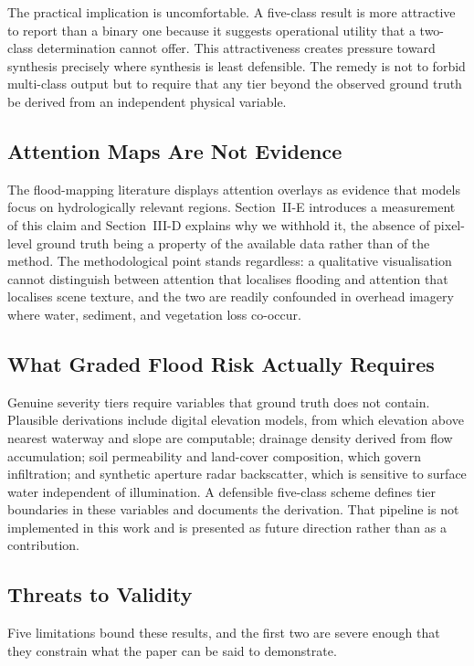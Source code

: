 \documentclass[11pt,journal]{IEEEtran}
\begin{document}
The practical implication is uncomfortable. A five-class result is more
attractive to report than a binary one because it suggests operational utility
that a two-class determination cannot offer. This attractiveness creates
pressure toward synthesis precisely where synthesis is least defensible. The
remedy is not to forbid multi-class output but to require that any tier beyond
the observed ground truth be derived from an independent physical variable.

\subsection{Attention Maps Are Not Evidence}

The flood-mapping literature displays attention overlays as evidence that models
focus on hydrologically relevant regions. Section~II-E introduces a measurement
of this claim and Section~III-D explains why we withhold it, the absence of
pixel-level ground truth being a property of the available data rather than of
the method. The methodological point stands regardless: a qualitative
visualisation cannot distinguish between attention that localises flooding and
attention that localises scene texture, and the two are readily confounded in
overhead imagery where water, sediment, and vegetation loss co-occur.

\subsection{What Graded Flood Risk Actually Requires}

Genuine severity tiers require variables that ground truth does not contain.
Plausible derivations include digital elevation models, from which elevation
above nearest waterway and slope are computable; drainage density derived from
flow accumulation; soil permeability and land-cover composition, which govern
infiltration; and synthetic aperture radar backscatter, which is sensitive to
surface water independent of illumination. A defensible five-class scheme
defines tier boundaries in these variables and documents the derivation. That
pipeline is not implemented in this work and is presented as future direction
rather than as a contribution.

\subsection{Threats to Validity}

Five limitations bound these results, and the first two are severe enough that
they constrain what the paper can be said to demonstrate.
\end{document}
